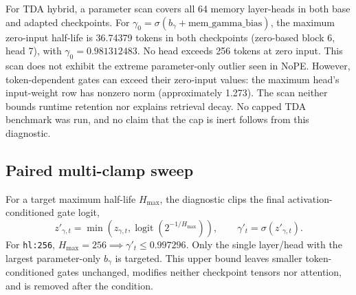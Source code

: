 For TDA hybrid, a parameter scan covers all 64 memory layer-heads in both base and adapted checkpoints. For $\gamma_0=\sigma(b_\gamma+\mathrm{mem\_gamma\_bias})$, the maximum zero-input half-life is 36.74379 tokens in both checkpoints (zero-based block 6, head 7), with $\gamma_0=0.981312483$. No head exceeds 256 tokens at zero input. This scan does not exhibit the extreme parameter-only outlier seen in NoPE. However, token-dependent gates can exceed their zero-input values: the maximum head's input-weight row has nonzero norm (approximately 1.273). The scan neither bounds runtime retention nor explains retrieval decay. No capped TDA benchmark was run, and no claim that the cap is inert follows from this diagnostic.

\subsection{Paired multi-clamp sweep}
For a target maximum half-life $H_{\max}$, the diagnostic clips the final activation-conditioned gate logit,
\begin{equation}
 z'_{\gamma,t}=\min\!\left(z_{\gamma,t},\operatorname{logit}(2^{-1/H_{\max}})\right),\qquad
 \gamma'_t=\sigma(z'_{\gamma,t}).
\end{equation}
For \texttt{hl:256}, $H_{\max}=256 \implies \gamma'_t\leq0.997296$. Only the single layer/head with the largest parameter-only $b_\gamma$ is targeted. This upper bound leaves smaller token-conditioned gates unchanged, modifies neither checkpoint tensors nor attention, and is removed after the condition.

